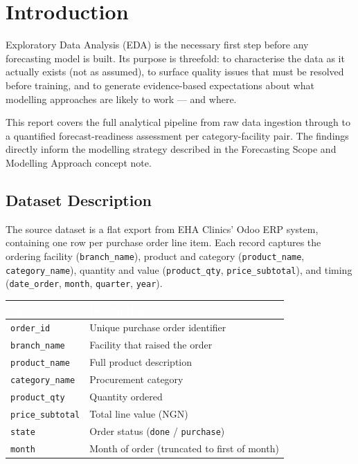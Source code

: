 \documentclass[12pt, a4paper]{article}
\newcounter{finding}
\begin{document}
\section{Introduction}

Exploratory Data Analysis (EDA) is the necessary first step before any
forecasting model is built. Its purpose is threefold: to characterise the
data as it actually exists (not as assumed), to surface quality issues that
must be resolved before training, and to generate evidence-based expectations
about what modelling approaches are likely to work --- and where.

This report covers the full analytical pipeline from raw data ingestion
through to a quantified forecast-readiness assessment per
category-facility pair. The findings directly inform the modelling strategy
described in the Forecasting Scope and Modelling Approach concept note.

\subsection{Dataset Description}

The source dataset is a flat export from EHA Clinics' Odoo ERP system,
containing one row per purchase order line item. Each record captures the
ordering facility (\texttt{branch\_name}), product and category
(\texttt{product\_name}, \texttt{category\_name}), quantity and value
(\texttt{product\_qty}, \texttt{price\_subtotal}), and timing
(\texttt{date\_order}, \texttt{month}, \texttt{quarter}, \texttt{year}).

\vspace{0.6em}
\noindent
\begin{tabularx}{\textwidth}{@{} L{4cm} X @{}}
  \toprule
  \textcolor{white}{\textbf{Field}} & \textcolor{white}{\textbf{Description}} \\
  \midrule
  \texttt{order\_id}          & Unique purchase order identifier \\
  \texttt{branch\_name}       & Facility that raised the order \\
  \texttt{product\_name}      & Full product description \\
  \texttt{category\_name}     & Procurement category \\
  \texttt{product\_qty}       & Quantity ordered \\
  \texttt{price\_subtotal}    & Total line value (NGN) \\
  \texttt{state}              & Order status (\texttt{done} / \texttt{purchase}) \\
  \texttt{month}              & Month of order (truncated to first of month) \\
  \bottomrule
\end{tabularx}
\end{document}
